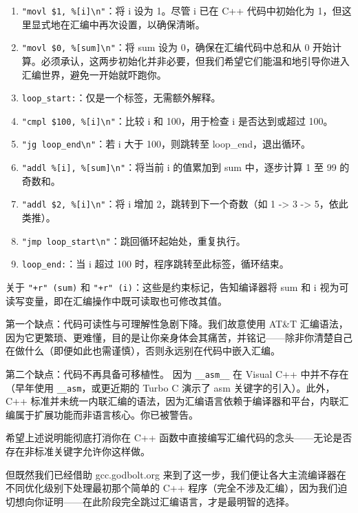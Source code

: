 \begin{enumerate}
\item 
\verb|"movl $1, %[i]\n"|：将 i 设为 1。尽管 i 已在 C++ 代码中初始化为 1，但这里显式地在汇编中再次设置，以确保清晰。

\item 
\verb|"movl $0, %[sum]\n"|：将 sum 设为 0，确保在汇编代码中总和从 0 开始计算。必须承认，这两步初始化并非必要，但我们希望它们能温和地引导你进入汇编世界，避免一开始就吓跑你。

\item 
\verb|loop_start:|：仅是一个标签，无需额外解释。

\item 
\verb|"cmpl $100, %[i]\n"|：比较 i 和 100，用于检查 i 是否达到或超过 100。

\item 
\verb|"jg loop_end\n"|：若 i 大于 100，则跳转至 loop\_end，退出循环。

\item 
\verb|"addl %[i], %[sum]\n"|：将当前 i 的值累加到 sum 中，逐步计算 1 至 99 的奇数和。

\item 
\verb|"addl $2, %[i]\n"|：将 i 增加 2，跳转到下一个奇数（如 1 -> 3 -> 5，依此类推）。

\item 
\verb|"jmp loop_start\n"|：跳回循环起始处，重复执行。

\item 
\verb|loop_end:|：当 i 超过 100 时，程序跳转至此标签，循环结束。
\end{enumerate}

关于 \verb|"+r" (sum)| 和 \verb|"+r" (i)|：这些是约束标记，告知编译器将 sum 和 i 视为可读写变量，即在汇编操作中既可读取也可修改其值。

第一个缺点：代码可读性与可理解性急剧下降。我们故意使用 AT\&T 汇编语法，因为它更繁琐、更难懂，目的是让你亲身体会其痛苦，并铭记——除非你清楚自己在做什么（即便如此也需谨慎），否则永远别在代码中嵌入汇编。

第二个缺点：代码不再具备可移植性。
因为 \verb|__asm__| 在 Visual C++ 中并不存在（早年使用 \verb|__asm|，或更近期的 Turbo C 演示了 asm 关键字的引入）。此外，C++ 标准并未统一内联汇编的语法，因为汇编语言依赖于编译器和平台，内联汇编属于扩展功能而非语言核心。你已被警告。

希望上述说明能彻底打消你在 C++ 函数中直接编写汇编代码的念头——无论是否存在非标准关键字允许你这样做。

但既然我们已经借助 gcc.godbolt.org 来到了这一步，我们便让各大主流编译器在不同优化级别下处理最初那个简单的 C++ 程序（完全不涉及汇编），因为我们迫切想向你证明——在此阶段完全跳过汇编语言，才是最明智的选择。


